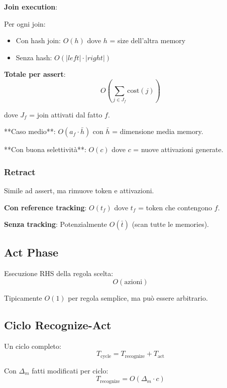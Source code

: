 \textbf{Join execution}:

Per ogni join:
\begin{itemize}
\item Con hash join: $O(h)$ dove $h$ = size dell'altra memory
\item Senza hash: $O(|left| \cdot |right|)$
\end{itemize}

\textbf{Totale per assert}:
\begin{equation}
O\left(\sum_{j \in J_f} \text{cost}(j)\right)
\end{equation}

dove $J_f$ = join attivati dal fatto $f$.

**Caso medio**: $O(a_f \cdot \bar{h})$ con $\bar{h}$ = dimensione media memory.

**Con buona selettività**: $O(c)$ dove $c$ = nuove attivazioni generate.

\subsubsection{Retract}

Simile ad assert, ma rimuove token e attivazioni.

\textbf{Con reference tracking}: $O(t_f)$ dove $t_f$ = token che contengono $f$.

\textbf{Senza tracking}: Potenzialmente $O(\bar{t})$ (scan tutte le memories).

\subsection{Act Phase}

Esecuzione RHS della regola scelta:
\begin{equation}
O(\text{azioni})
\end{equation}

Tipicamente $O(1)$ per regola semplice, ma può essere arbitrario.

\subsection{Ciclo Recognize-Act}

Un ciclo completo:
\begin{equation}
T_{\text{cycle}} = T_{\text{recognize}} + T_{\text{act}}
\end{equation}

Con $\Delta_m$ fatti modificati per ciclo:
\begin{equation}
T_{\text{recognize}} = O(\Delta_m \cdot c)
\end{equation}

